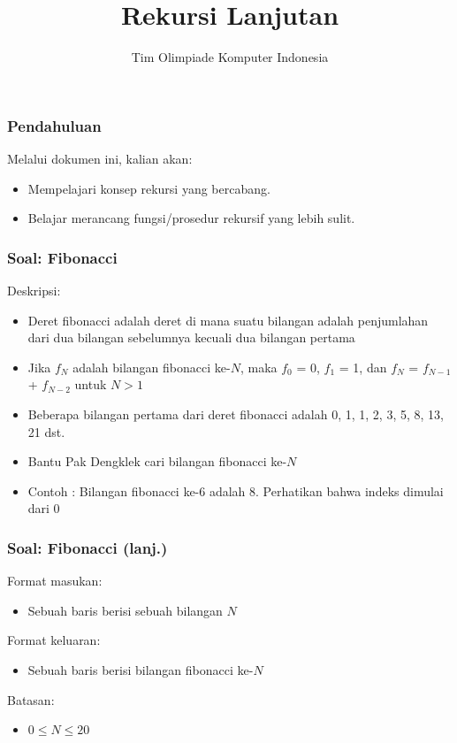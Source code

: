 


\title{Rekursi Lanjutan}
\author{Tim Olimpiade Komputer Indonesia}
\date{}



\begin{frame}
\titlepage
\end{frame}

\begin{frame}
\frametitle{Pendahuluan}
Melalui dokumen ini, kalian akan:
\begin{itemize}
  \item Mempelajari konsep rekursi yang bercabang.
  \item Belajar merancang fungsi/prosedur rekursif yang lebih sulit.
\end{itemize}
\end{frame}

\begin{frame}
\frametitle{Soal: Fibonacci}
Deskripsi:
\begin{itemize}
  \item Deret fibonacci adalah deret di mana suatu bilangan adalah penjumlahan dari dua bilangan sebelumnya kecuali dua bilangan pertama
  \item Jika $f_N$ adalah bilangan fibonacci ke-$N$, maka $f_0$ = 0, $f_1$ = 1, dan $f_N$ = $f_{N-1}$ + $f_{N-2}$ untuk $N > 1$
  \item Beberapa bilangan pertama dari deret fibonacci adalah 0, 1, 1, 2, 3, 5, 8, 13, 21 dst.
  \item Bantu Pak Dengklek cari bilangan fibonacci ke-$N$
  \item Contoh : Bilangan fibonacci ke-6 adalah 8. Perhatikan bahwa indeks dimulai dari 0
\end{itemize}
\end{frame}

\begin{frame}
\frametitle{Soal: Fibonacci (lanj.) }
Format masukan:
\begin{itemize}
    \item Sebuah baris berisi sebuah bilangan $N$
\end{itemize}
Format keluaran:
\begin{itemize}
    \item Sebuah baris berisi bilangan fibonacci ke-$N$
\end{itemize}
Batasan:
\begin{itemize}
    \item $0 \le N \le 20$
\end{itemize}
\end{frame}

